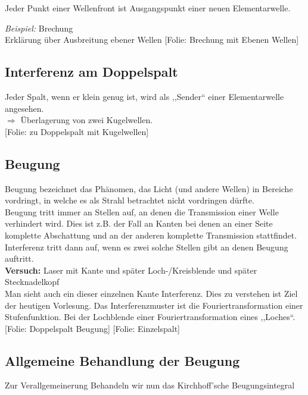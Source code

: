 \documentclass[titlepage,11pt,a4paper,ngerman]{report}
\newcommand{\folie}[1]{\color{gray}[Folie: #1]\color{black}}
\newcommand{\versuch}[1]{\color{red!50!black} \textbf{Versuch:} \color{black} #1\\ }
\newcommand{\lcom}[1]{\color{MidnightBlue}#1\color{black}}
\newcommand{\rbox}[1]{\begin{tcolorbox}[colback=white,colframe=red!75!black]#1\end{tcolorbox}}
\begin{document}
\rbox{Jeder Punkt einer Wellenfront ist Ausgangspunkt einer neuen Elementarwelle.}
\noindent
\emph{Beispiel:} Brechung\\
Erklärung über Ausbreitung ebener Wellen \folie{Brechung mit Ebenen Wellen}


\subsection{Interferenz am Doppelspalt}

Jeder Spalt, wenn er klein genug ist, wird als ,,Sender`` einer Elementarwelle angesehen.\\
$ \Rightarrow $ Überlagerung von zwei Kugelwellen.\\
\folie{zu Doppelspalt mit Kugelwellen}


\subsection{Beugung}

Beugung bezeichnet das Phänomen, das Licht (und andere Wellen) in Bereiche vordringt, in welche es als Strahl betrachtet nicht vordringen dürfte.\\
\lcom{Beugung tritt immer an Stellen auf, an denen die Transmission einer Welle verhindert wird. Dies ist z.B. der Fall an Kanten bei denen an einer Seite komplette Abschattung und an der anderen komplette Transmission stattfindet.}\\
\lcom{Interferenz tritt dann auf, wenn es zwei solche Stellen gibt an denen Beugung auftritt.}\\
\versuch{Laser mit Kante und später Loch-/Kreisblende und später Stecknadelkopf}
\lcom{Man sieht auch ein dieser einzelnen Kante Interferenz. Dies zu verstehen ist Ziel der heutigen Vorlesung. Das Interferenzmuster ist die Fouriertransformation einer Stufenfunktion. Bei der Lochblende einer Fouriertransformation eines ,,Loches``.}\\
\folie{Doppelspalt Beugung} \folie{Einzelspalt}\\

\subsection{Allgemeine Behandlung der Beugung}

\lcom{Zur Verallgemeinerung Behandeln wir nun das Kirchhoff'sche Beugungsintegral}
\end{document}
